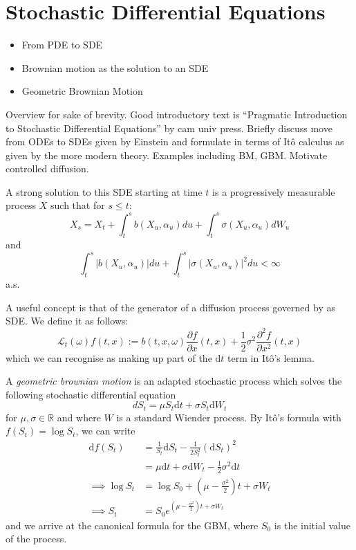 \section{Stochastic Differential Equations}\label{sec:1.6}
\begin{itemize}
    \item From PDE to SDE
    \item Brownian motion as the solution to an SDE
    \item Geometric Brownian Motion
\end{itemize}

Overview for sake of brevity. Good introductory text is ``Pragmatic Introduction to Stochastic
Differential Equations'' by cam univ press. Briefly discuss move from ODEs to SDEs given by 
Einstein and formulate in terms of It\^{o} calculus as given by the more modern theory. Examples
including BM, GBM. Motivate controlled diffusion.

\begin{definition}
    A strong solution to this SDE starting at time $t$ is a progressively measurable process $X$ such that for $s\leq t$:
    $$X_s=X_t+\int_{t}^{s}b(X_u,\alpha_u)du+\int_t^s\sigma(X_u,\alpha_u)dW_u$$
    and
    $$\int_t^s|b(X_u,\alpha_u)|du+\int_t^s|\sigma(X_u,\alpha_u)|^2du<\infty$$
    a.s.
\end{definition}

\begin{definition}
    A useful concept is that of the generator of a diffusion process governed by 
    as SDE. We define it as follows:
    \begin{equation}
        \mathcal{L}_t(\omega)f(t,x):=b(t,x,\omega)\frac{\partial f}{\partial x}(t,x)+\frac{1}{2}\sigma^2\frac{\partial^2f}{\partial x^2}(t,x)
    \end{equation}
    which we can recognise as making up part of the $\mathrm dt$ term in It\^{o}'s lemma.
\end{definition}

\begin{definition}
    A \emph{geometric brownian motion} is an adapted stochastic process which solves the following
    stochastic differential equation
    \begin{equation}
        dS_t=\mu S_t\mathrm dt + \sigma S_t\mathrm dW_t
    \end{equation}
    for $\mu,\sigma\in\mathbb{R}$ and where $W$ is a standard Wiender process.
    By It\^{o}'s formula with $f(S_t)=\log S_t$, we can write
    \begin{align*}
        \mathrm df(S_t)&=\frac{1}{S_t}\mathrm dS_t-\frac{1}{2S_t^2}(\mathrm dS_t)^2\\
        &=\mu\mathrm dt+\sigma\mathrm dW_t-\frac{1}{2}\sigma^2\mathrm dt\\
        \implies \log S_t&=\log S_0+\left(\mu-\frac{\sigma^2}{2}\right)t+\sigma W_t\\
        \implies S_t&=S_0e^{\left(\mu-\frac{\sigma^2}{2}\right)t+\sigma W_t}
    \end{align*}
    and we arrive at the canonical formula for the GBM, where $S_0$ is the initial value of the process.
\end{definition}
